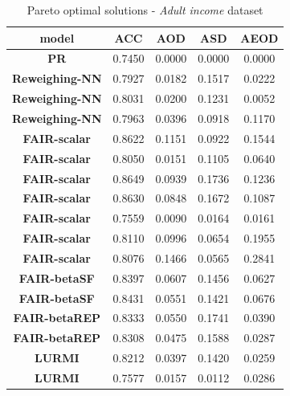 \documentclass[preprint,12pt]{elsarticle}
\begin{document}
\begin{table}
	\centering
	\caption{Pareto optimal solutions - \textit{Adult income} dataset}
	\begin{tabular}{|c|c|c|c|c|}
		\hline
		\textbf{model}           & \textbf{ACC} & \textbf{AOD} & \textbf{ASD} & \textbf{AEOD} \\ \hline
		\textbf{PR}              & 0.7450       & 0.0000       & 0.0000       & 0.0000        \\ \hline
		\textbf{Reweighing-NN}   & 0.7927       & 0.0182       & 0.1517       & 0.0222        \\ \hline
		\textbf{Reweighing-NN}   & 0.8031       & 0.0200       & 0.1231       & 0.0052        \\ \hline
		\textbf{Reweighing-NN}   & 0.7963       & 0.0396       & 0.0918       & 0.1170        \\ \hline
		\textbf{FAIR-scalar}     & 0.8622       & 0.1151       & 0.0922       & 0.1544        \\ \hline
		\textbf{FAIR-scalar}     & 0.8050       & 0.0151       & 0.1105       & 0.0640        \\ \hline
		\textbf{FAIR-scalar}     & 0.8649       & 0.0939       & 0.1736       & 0.1236        \\ \hline
		\textbf{FAIR-scalar}     & 0.8630       & 0.0848       & 0.1672       & 0.1087        \\ \hline
		\textbf{FAIR-scalar}     & 0.7559       & 0.0090       & 0.0164       & 0.0161        \\ \hline
		\textbf{FAIR-scalar}     & 0.8110       & 0.0996       & 0.0654       & 0.1955        \\ \hline
		\textbf{FAIR-scalar}     & 0.8076       & 0.1466       & 0.0565       & 0.2841        \\ \hline
		\textbf{FAIR-betaSF}     & 0.8397       & 0.0607       & 0.1456       & 0.0627        \\ \hline
		\textbf{FAIR-betaSF}     & 0.8431       & 0.0551       & 0.1421       & 0.0676        \\ \hline
		\textbf{FAIR-betaREP}    & 0.8333       & 0.0550       & 0.1741       & 0.0390        \\ \hline
		\textbf{FAIR-betaREP}    & 0.8308       & 0.0475       & 0.1588       & 0.0287        \\ \hline
		\textbf{LURMI}           & 0.8212       & 0.0397       & 0.1420       & 0.0259        \\ \hline
		\textbf{LURMI}           & 0.7577       & 0.0157       & 0.0112       & 0.0286        \\ \hline

\end{tabular}
\end{table}
\end{document}
